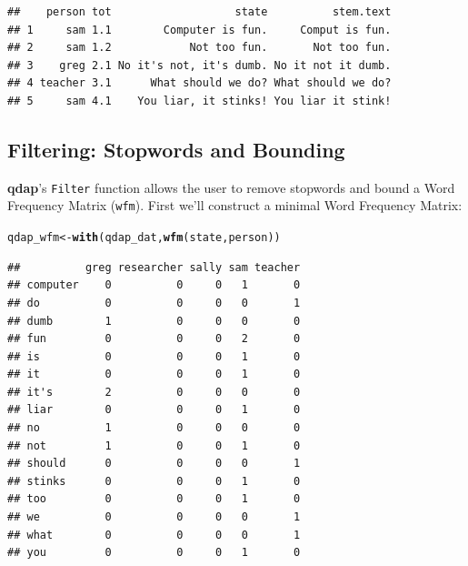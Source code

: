 \documentclass{article}\usepackage[]{graphicx}\usepackage[]{color}
\makeatletter
\newcommand{\hlstd}[1]{\textcolor[rgb]{0.345,0.345,0.345}{#1}}%
\newcommand{\hlkwb}[1]{\textcolor[rgb]{0.69,0.353,0.396}{#1}}%
\newcommand{\hlkwd}[1]{\textcolor[rgb]{0.737,0.353,0.396}{\textbf{#1}}}%
\newenvironment{kframe}{%
 \def\at@end@of@kframe{}%
 \ifinner\ifhmode%
  \def\at@end@of@kframe{\end{minipage}}%
  \begin{minipage}{\columnwidth}%
 \fi\fi%
 \def\FrameCommand##1{\hskip\@totalleftmargin \hskip-\fboxsep
 \colorbox{shadecolor}{##1}\hskip-\fboxsep
     \hskip-\linewidth \hskip-\@totalleftmargin \hskip\columnwidth}%
 \MakeFramed {\advance\hsize-\width
   \@totalleftmargin\z@ \linewidth\hsize
   \@setminipage}}%
 {\par\unskip\endMakeFramed%
 \at@end@of@kframe}
\newenvironment{knitrout}{}{} %
\makeatother
\begin{document}
\begin{knitrout}
\color{fgcolor}\begin{kframe}
\begin{verbatim}
##    person tot                   state          stem.text
## 1     sam 1.1        Computer is fun.     Comput is fun.
## 2     sam 1.2            Not too fun.       Not too fun.
## 3    greg 2.1 No it's not, it's dumb. No it not it dumb.
## 4 teacher 3.1      What should we do? What should we do?
## 5     sam 4.1    You liar, it stinks! You liar it stink!
\end{verbatim}
\end{kframe}
\end{knitrout}



\subsection{Filtering: Stopwords and Bounding}
    

\hspace{.4cm} \textbf{qdap}'s \texttt{Filter} function allows the user to remove stopwords and bound a Word Frequency Matrix (\texttt {wfm}).  First we'll construct a minimal Word Frequency Matrix:

\begin{knitrout}
\color{fgcolor}\begin{kframe}
\begin{alltt}
\hlstd{qdap_wfm} \hlkwb{<-} \hlkwd{with}\hlstd{(qdap_dat,} \hlkwd{wfm}\hlstd{(state, person))}
\end{alltt}
\end{kframe}
\end{knitrout}


\begin{knitrout}
\color{fgcolor}\begin{kframe}
\begin{verbatim}
##          greg researcher sally sam teacher
## computer    0          0     0   1       0
## do          0          0     0   0       1
## dumb        1          0     0   0       0
## fun         0          0     0   2       0
## is          0          0     0   1       0
## it          0          0     0   1       0
## it's        2          0     0   0       0
## liar        0          0     0   1       0
## no          1          0     0   0       0
## not         1          0     0   1       0
## should      0          0     0   0       1
## stinks      0          0     0   1       0
## too         0          0     0   1       0
## we          0          0     0   0       1
## what        0          0     0   0       1
## you         0          0     0   1       0
\end{verbatim}
\end{kframe}
\end{knitrout}
\end{document}
